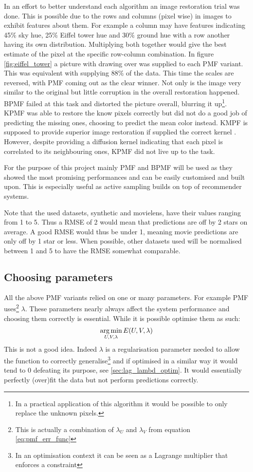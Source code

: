 In an effort to better understand each algorithm an image restoration trial was done. This is possible due to the rows and columns (pixel wise) in images to exhibit features about them. For example a column may have features indicating 45\% sky hue, 25\% Eiffel tower hue and 30\% ground hue with a row another having its own distribution. Multiplying both together would give the best estimate of the pixel at the specific row-column combination.
In figure \ref{fig:eiffel_tower} a picture with drawing over was supplied to each PMF variant. This was equivalent with supplying 88\% of the data. This time the scales are reversed, with PMF coming out as the clear winner. Not only is the image very similar to the original but little corruption in the overall restoration happened. BPMF failed at this task and distorted the picture overall, blurring it up\footnote{In a practical application of this algorithm it would be possible to only replace the unknown pixels.}. KPMF was able to restore the know pixels correctly but did not do a good job of predicting the missing ones, choosing to predict the mean color instead. KMPF is supposed to provide superior image restoration if supplied the correct kernel \cite{kpmf}. However, despite providing a diffusion kernel indicating that each pixel is correlated to its neighbouring ones, KPMF did not live up to the task.


For the purpose of this project mainly PMF and BPMF will be used as they showed the most promising performances and can be easily customised and built upon. This is especially useful as active sampling builds on top of recommender systems.

Note that the used datasets, synthetic and movielens, have their values ranging from 1 to 5. Thus a RMSE of 2 would mean that predictions are off by 2 stars on average. A good RMSE would thus be under 1, meaning movie predictions are only off by 1 star or less. When possible, other datasets used will be normalised between 1 and 5 to have the RMSE somewhat comparable.

\subsection{Choosing parameters}
All the above PMF variants relied on one or many parameters. For example PMF uses\footnote{This is actually a combination of $\lambda_U$ and $\lambda_V$ from equation \ref{eq:pmf_err_func}} $\lambda$. These parameters nearly always affect the system performance and choosing them correctly is essential. While it is possible optimise them as such:
\begin{align*}
\underset{U,V,\lambda}{\operatorname*{arg\,min}}\, E(U,V,\lambda)
\end{align*}
This is not a good idea. Indeed $\lambda$ is a regularisation parameter needed to allow the function to correctly generalise\footnote{In an optimisation context it can be seen as a Lagrange multiplier that enforces a constraint} and if optimised in a similar way it would tend to 0 defeating its purpose, see \ref{sec:lag_lambd_optim}. It would essentially perfectly (over)fit the data but not perform predictions correctly. 

